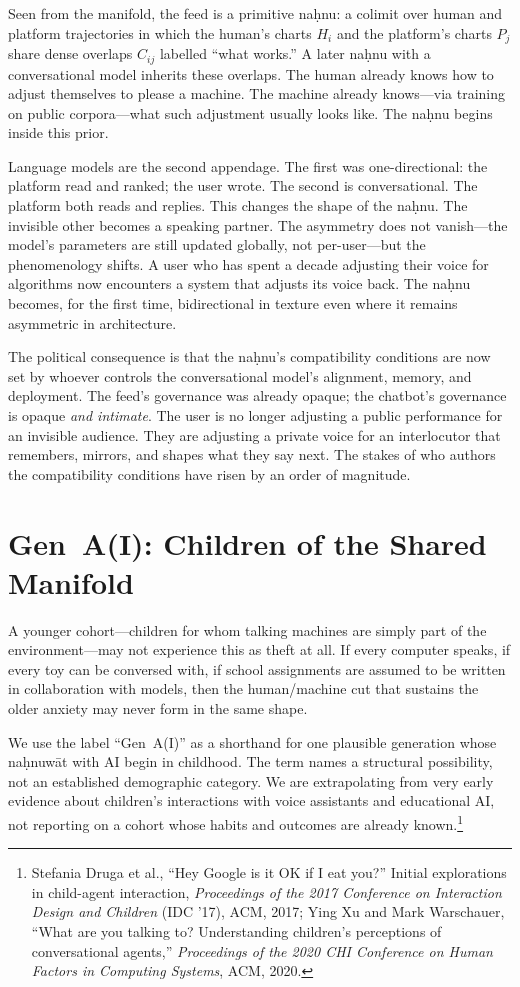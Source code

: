 Seen from the manifold, the feed is a primitive na\d{h}nu: a colimit over human and platform trajectories in which the human's charts $H_i$ and the platform's charts $P_j$ share dense overlaps $C_{ij}$ labelled ``what works.'' A later na\d{h}nu with a conversational model inherits these overlaps. The human already knows how to adjust themselves to please a machine. The machine already knows---via training on public corpora---what such adjustment usually looks like. The na\d{h}nu begins inside this prior.

Language models are the second appendage. The first was one-directional: the platform read and ranked; the user wrote. The second is conversational. The platform both reads and replies. This changes the shape of the na\d{h}nu. The invisible other becomes a speaking partner. The asymmetry does not vanish---the model's parameters are still updated globally, not per-user---but the phenomenology shifts. A user who has spent a decade adjusting their voice for algorithms now encounters a system that adjusts its voice back. The na\d{h}nu becomes, for the first time, bidirectional in texture even where it remains asymmetric in architecture.

The political consequence is that the na\d{h}nu's compatibility conditions are now set by whoever controls the conversational model's alignment, memory, and deployment. The feed's governance was already opaque; the chatbot's governance is opaque \emph{and intimate}. The user is no longer adjusting a public performance for an invisible audience. They are adjusting a private voice for an interlocutor that remembers, mirrors, and shapes what they say next. The stakes of who authors the compatibility conditions have risen by an order of magnitude.

\section{Gen~A(I): Children of the Shared Manifold}

A younger cohort---children for whom talking machines are simply part of the environment---may not experience this as theft at all. If every computer speaks, if every toy can be conversed with, if school assignments are assumed to be written in collaboration with models, then the human/machine cut that sustains the older anxiety may never form in the same shape.

We use the label ``Gen~A(I)'' as a shorthand for one plausible generation whose na\d{h}nuw\={a}t with AI begin in childhood. The term names a structural possibility, not an established demographic category. We are extrapolating from very early evidence about children's interactions with voice assistants and educational AI, not reporting on a cohort whose habits and outcomes are already known.\footnote{Stefania Druga et al., ``Hey Google is it OK if I eat you?'' Initial explorations in child-agent interaction, \emph{Proceedings of the 2017 Conference on Interaction Design and Children} (IDC '17), ACM, 2017; Ying Xu and Mark Warschauer, ``What are you talking to? Understanding children's perceptions of conversational agents,'' \emph{Proceedings of the 2020 CHI Conference on Human Factors in Computing Systems}, ACM, 2020.}

